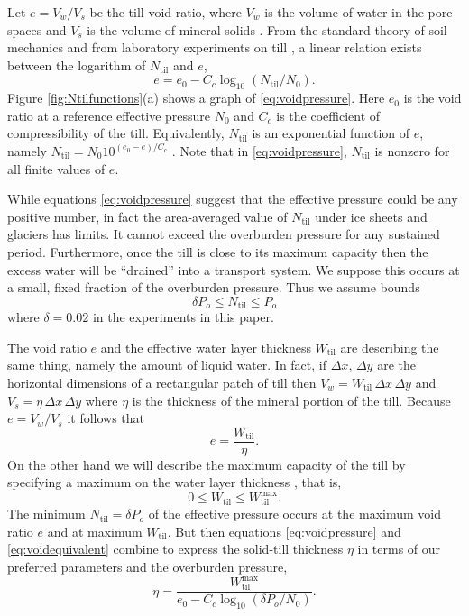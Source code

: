 \documentclass[gmd]{copernicus}   %
\newcommand{\text}{\textrm}
\newcommand{\Ntil}{N_{\text{til}}}
\newcommand{\Wtil}{W_{\text{til}}}
\newcommand{\Wtilmax}{W_{\text{til}}^{\text{max}}}
\begin{document}
Let $e = V_w / V_s$ be the till void ratio, where $V_w$ is the volume of water in the pore spaces and $V_s$ is the volume of mineral solids \citep{Tulaczyketal2000}.  From the standard theory of soil mechanics and from laboratory experiments on till \citep{Hookeetal1997,Tulaczyketal2000}, a linear relation exists between the logarithm of $\Ntil$ and $e$,
\begin{equation}
e = e_0 - C_c \log_{10}\left(\Ntil / N_0\right).  \label{eq:voidpressure}
\end{equation}
Figure \ref{fig:Ntilfunctions}(a) shows a graph of \eqref{eq:voidpressure}.  Here $e_0$ is the void ratio at a reference effective pressure $N_0$ and $C_c$ is the coefficient of compressibility of the till.  Equivalently, $\Ntil$ is an exponential function of $e$, namely $\Ntil = N_0 10^{(e_0 - e)/C_c}$ \citep[equation (15)]{vanderWeletal2013}.  Note that in \eqref{eq:voidpressure}, $\Ntil$ is nonzero for all finite values of $e$.

While equations \eqref{eq:voidpressure} suggest that the effective pressure could be any positive number, in fact the area-averaged value of $\Ntil$ under ice sheets and glaciers has limits.  It cannot exceed the overburden pressure for any sustained period.  Furthermore, once the till is close to its maximum capacity then the excess water will be ``drained'' into a transport system.  We suppose this occurs at a small, fixed fraction of the overburden pressure.  Thus we assume bounds
\begin{equation}
\delta P_o \le \Ntil \le P_o  \label{eq:Ntilbounds}
\end{equation}
where $\delta = 0.02$ in the experiments in this paper.

The void ratio $e$ and the effective water layer thickness $\Wtil$ are describing the same thing, namely the amount of liquid water.  In fact, if $\Delta x$, $\Delta y$ are the horizontal dimensions of a rectangular patch of till then $V_w = \Wtil \,\Delta x \,\Delta y$ and $V_s = \eta \,\Delta x \,\Delta y$ where $\eta$ is the thickness of the mineral portion of the till.  Because $e=V_w/V_s$ it follows that
\begin{equation}
e = \frac{\Wtil}{\eta}.  \label{eq:voidequivalent}
\end{equation}
On the other hand we will describe the maximum capacity of the till by specifying a maximum on the water layer thickness \citep{BBssasliding}, that is,
\begin{equation}
0 \le \Wtil \le \Wtilmax.  \label{eq:Wtilbounds}
\end{equation}
The minimum $\Ntil=\delta P_o$ of the effective pressure occurs at the maximum void ratio $e$ and at maximum $\Wtil$.  But then equations \eqref{eq:voidpressure} and \eqref{eq:voidequivalent} combine to express the solid-till thickness $\eta$ in terms of our preferred parameters and the overburden pressure,
\begin{equation}
\eta = \frac{\Wtilmax}{e_0 - C_c \log_{10}\left(\delta P_o / N_0\right)}.  \label{eq:etaexpression}
\end{equation}
\end{document}
